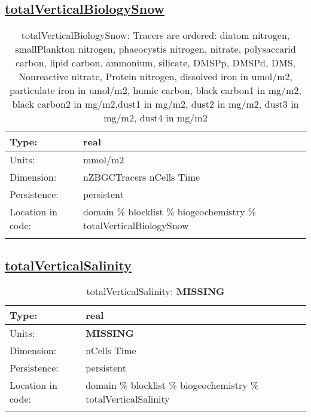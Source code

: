 \subsection[totalVerticalBiologySnow]{\hyperref[sec:var_tab_biogeochemistry]{totalVerticalBiologySnow}}
\label{subsec:var_sec_biogeochemistry_totalVerticalBiologySnow}
\begin{center}
\begin{longtable}{| p{2.0in} | p{4.0in} |}
        \hline 
        Type: & real \\
        \hline 
        Units: & \si{mmol/m2} \\
        \hline 
        Dimension: & nZBGCTracers nCells Time \\
        \hline 
        Persistence: & persistent \\
        \hline 
         Location in code: & domain \% blocklist \% biogeochemistry \% totalVerticalBiologySnow \\
         \hline 
    \caption{totalVerticalBiologySnow: Tracers are ordered: diatom nitrogen, smallPlankton nitrogen, phaeocystis nitrogen, nitrate, polysaccarid carbon, lipid carbon, ammonium, silicate, DMSPp, DMSPd, DMS, Nonreactive nitrate, Protein nitrogen, dissolved iron in umol/m2, particulate iron in umol/m2, humic carbon, black carbon1 in mg/m2, black carbon2 in mg/m2,dust1 in mg/m2, dust2 in mg/m2, dust3 in mg/m2, dust4 in mg/m2}
\end{longtable}
\end{center}
\subsection[totalVerticalSalinity]{\hyperref[sec:var_tab_biogeochemistry]{totalVerticalSalinity}}
\label{subsec:var_sec_biogeochemistry_totalVerticalSalinity}
\begin{center}
\begin{longtable}{| p{2.0in} | p{4.0in} |}
        \hline 
        Type: & real \\
        \hline 
        Units: & {\bf \color{red} MISSING} \\
        \hline 
        Dimension: & nCells Time \\
        \hline 
        Persistence: & persistent \\
        \hline 
         Location in code: & domain \% blocklist \% biogeochemistry \% totalVerticalSalinity \\
         \hline 
    \caption{totalVerticalSalinity: {\bf \color{red} MISSING}}
\end{longtable}
\end{center}
